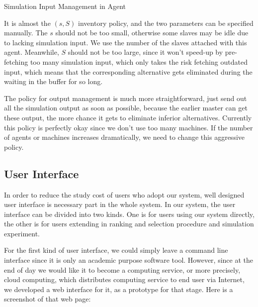 \begin{algorithm}
\begin{algorithmic}[1]
    \EndFor
  \Else
  \EndIf
\EndWhile
\end{algorithmic}
\caption{Simulation Input Management in Agent}
\label{input_buf_alg}
\end{algorithm}

It is almost the $(s, S)$ inventory policy, and the two parameters can be specified manually. The $s$ should not be too small, otherwise some slaves may be idle due to lacking simulation input. We use the number of the slaves attached with this agent. Meanwhile, $S$ should not be too large, since it won't speed-up by pre-fetching too many simulation input, which only takes the risk fetching outdated input, which means that the corresponding alternative gets eliminated during the waiting in the buffer for so long.

The policy for output management is much more straightforward, just send out all the simulation output as soon as possible, because the earlier master can get these output, the more chance it gets to eliminate inferior alternatives. Currently this policy is perfectly okay since we don't use too many machines. If the number of agents or machines increases dramatically, we need to change this aggressive policy.

\subsection{User Interface}

In order to reduce the study cost of users who adopt our system, well designed user interface is necessary part in the whole system. In our system, the user interface can be divided into two kinds. One is for users using our system directly, the other is for users extending in ranking and selection procedure and simulation experiment.

For the first kind of user interface, we could simply leave a command line interface since it is only an academic purpose software tool. However, since at the end of day we would like it to become a computing service, or more precisely, cloud computing, which distributes computing service to end user via Internet, we developed a web interface for it, as a prototype for that stage. Here is a screenshot of that web page:

